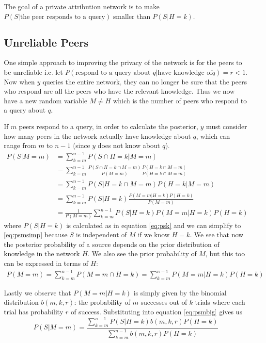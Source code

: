 \documentclass{article}
\newcommand{\eqnref}[1]{equation \eqref{eq:#1}}
\begin{document}
The goal of a private attribution network is to make $P(S|\text{the peer
responds to a query})$ smaller than $P(S|H=k)$.

\subsection{Unreliable Peers}\label{sec:unreliable}

One simple approach to improving the privacy of the network is for the peers to be
unreliable i.e. let $P(\text{respond to a query about }q|\text{have knowledge of
}q)=r<1$. Now when $y$ queries the entire network, they can no longer be sure
that the peers who respond are all the peers who have the relevant knowledge.
Thus we now have a new random variable $M\ne H$ which is the number of peers who
respond to a query about $q$.

If $m$ peers respond to a query, in order to calculate the posterior, $y$ must
consider how many peers in the network actually have knowledge about $q$, which
can range from $m$ to $n-1$ (since $y$ does not know about $q$).
\begin{align}
	P(S|M=m)&=\sum_{k=m}^{n-1}P(S\cap H=k|M=m)\nonumber\\
	&=\sum_{k=m}^{n-1}\frac{P(S\cap H=k\cap M=m)}{P(M=m)}\frac{P(H=k\cap
	M=m)}{P(H=k\cap M=m)}\nonumber\\
	&=\sum_{k=m}^{n-1}P(S|H=k\cap M=m)P(H=k|M=m)\nonumber\\
	&=\sum_{k=m}^{n-1}P(S|H=k)\frac{P(M=m|H=k)P(H=k)}{P(M=m)}\label{eq:psmsimp}\\
	&=\frac{1}{P(M=m)}\sum_{k=m}^{n-1}P(S|H=k)P(M=m|H=k)P(H=k)\label{eq:psmbig}
\end{align}
where $P(S|H=k)$ is calculated as in \eqnref{psk} and we can simplify to
\eqref{eq:psmsimp} because $S$ is independent of $M$ if we know $H=k$.
We see that now the posterior probability of a source depends on the prior
distribution of knowledge in the network $H$. We also see the prior probability
of $M$, but this too can be expressed in terms of $H$:
\begin{align*}
	P(M=m)=\sum_{k=m}^{n-1}P(M=m\cap H=k)=\sum_{k=m}^{n-1}P(M=m|H=k)P(H=k)
\end{align*}

Lastly we observe that $P(M=m|H=k)$ is simply given by the binomial
distribution $b(m,k,r)$: the probability of $m$ successes out of $k$ trials where
each trial has probability $r$ of success. Substituting into \eqnref{psmbig} gives us
\begin{equation}\label{eq:psm}
	P(S|M=m)=\frac{\sum_{k=m}^{n-1}P(S|H=k)b(m,k,r)P(H=k)}{\sum_{k=m}^{n-1}b(m,k,r)P(H=k)}
\end{equation}
\end{document}
